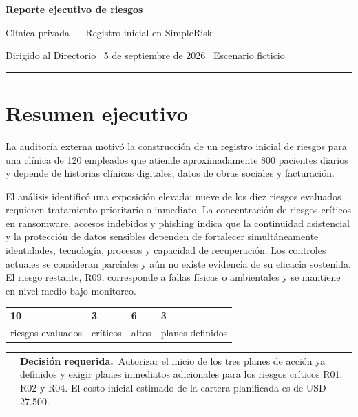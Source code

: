 \documentclass[10pt,a4paper]{article}
\makeatletter
\newcommand{\decisionbox}[1]{%
\noindent\begin{tabularx}{\linewidth}{@{}p{0.2cm} X@{}}
\color{accent}\rule{0.6pt}{\baselineskip} & \small\textbf{Decisión requerida.}\ #1
\end{tabularx}\vspace{1mm}}
\makeatother
\begin{document}
\thispagestyle{empty}
{\color{ink}\Huge\bfseries Reporte ejecutivo de riesgos}\par
\vspace{1mm}
{\color{muted}\large Clínica privada --- Registro inicial en SimpleRisk}\par
\vspace{2mm}
{\color{muted}\normalsize Dirigido al Directorio \textbar\ 5 de septiembre de 2026 \textbar\ Escenario ficticio}\par
\vspace{2mm}
{\color{rule}\rule{\linewidth}{0.8pt}}
\vspace{4mm}

\pagestyle{fancy}

\section*{Resumen ejecutivo}

La auditoría externa motivó la construcción de un registro inicial de riesgos para una clínica de 120 empleados que atiende aproximadamente 800 pacientes diarios y depende de historias clínicas digitales, datos de obras sociales y facturación.

El análisis identificó una exposición elevada: nueve de los diez riesgos evaluados requieren tratamiento prioritario o inmediato. La concentración de riesgos críticos en ransomware, accesos indebidos y phishing indica que la continuidad asistencial y la protección de datos sensibles dependen de fortalecer simultáneamente identidades, tecnología, procesos y capacidad de recuperación. Los controles actuales se consideran parciales y aún no existe evidencia de su eficacia sostenida. El riesgo restante, R09, corresponde a fallas físicas o ambientales y se mantiene en nivel medio bajo monitoreo.

\vspace{2mm}
\noindent
\begin{tabularx}{\linewidth}{XXXX}
\textbf{\large 10} & \textbf{\large 3} & \textbf{\large 6} & \textbf{\large 3} \\
{\scriptsize\color{muted}riesgos evaluados} & {\scriptsize\color{muted}críticos} & {\scriptsize\color{muted}altos} & {\scriptsize\color{muted}planes definidos}
\end{tabularx}

\vspace{3mm}
\decisionbox{Autorizar el inicio de los tres planes de acción ya definidos y exigir planes inmediatos adicionales para los riesgos críticos R01, R02 y R04. El costo inicial estimado de la cartera planificada es de USD 27.500.}
\end{document}
